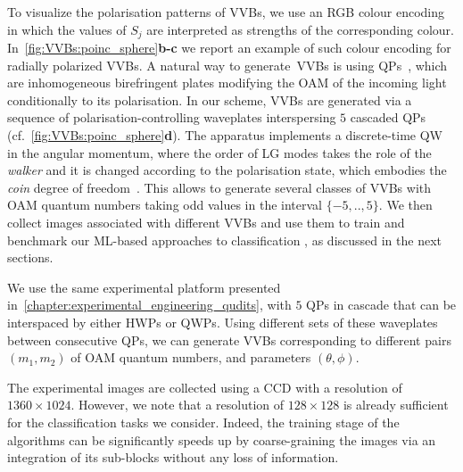 To visualize the polarisation patterns of \acp{VVB}, we use an RGB colour encoding in which the values of $S_j$ are interpreted as strengths of the corresponding colour. In~\cref{fig:VVBs:poinc_sphere}\textbf{b-c} we report an example of such colour encoding for radially polarized \acp{VVB}.
A natural way to generate~\acp{VVB} is using \acp{QP}~\cite{marrucci2006optical,cardano2012polarization}, which are inhomogeneous birefringent plates modifying the OAM of the incoming light conditionally to its polarisation. 
In our scheme, \acp{VVB} are generated via a sequence of polarisation-controlling waveplates interspersing $5$ cascaded QPs (cf.~\cref{fig:VVBs:poinc_sphere}\textbf{d}).
The apparatus implements a discrete-time QW in the angular momentum, where the order of LG modes takes the role of the \emph{walker} and it is changed according to the polarisation state, which embodies the \emph{coin} degree of freedom~\cite{zhang2010implementation,goyal2013implementing,cardano2015quantum,innocenti2017quantum,giordani2019experimental}.
This allows to generate several classes of VVBs with OAM quantum numbers taking odd values in the interval $\{-5,..,5\}$.
We then collect images associated with different \acp{VVB} and use them to train and benchmark our ML-based approaches to classification , as discussed in the next sections.


We use the same experimental platform presented in~\cref{chapter:experimental_engineering_qudits}, with $5$ \acp{QP} in cascade that can be interspaced by either \acp{HWP} or \acp{QWP}. 
Using different sets of these waveplates between consecutive QPs, we can generate VVBs corresponding to different pairs $(m_1,m_2)$ of OAM quantum numbers, and parameters $(\theta, \phi)$.


The experimental images are collected using a \ac{CCD} with a resolution of $1360 \times 1024$. 
However, we note that a resolution of $128 \times 128$ is already sufficient for the classification tasks we consider. Indeed, the training stage of the algorithms can be significantly speeds up by coarse-graining the images via an integration of its sub-blocks without any loss of information. 

